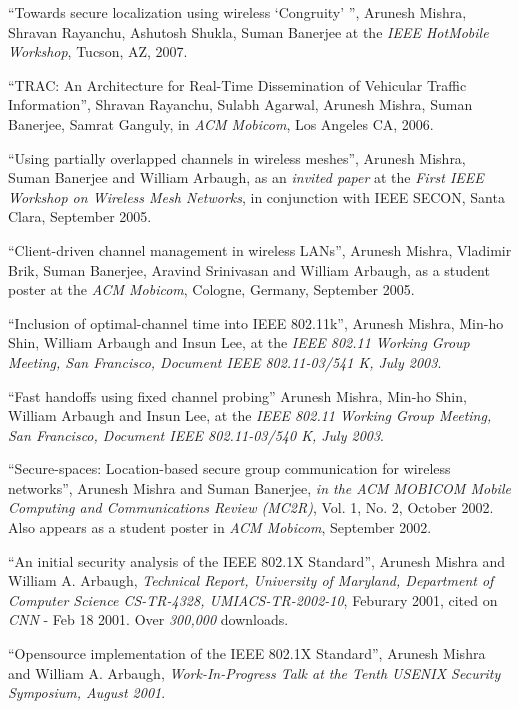 \begin{resume}
\vspace{-0.7cm}

\mybullet ``Towards secure localization using wireless `Congruity' '', Arunesh Mishra, Shravan Rayanchu, Ashutosh Shukla, Suman Banerjee
at the {\it IEEE HotMobile Workshop}, Tucson, AZ, 2007.

\mybullet ``TRAC: An Architecture for Real-Time Dissemination of Vehicular Traffic Information'',
Shravan Rayanchu, Sulabh Agarwal, Arunesh Mishra, Suman Banerjee, Samrat Ganguly,  in {\it ACM Mobicom}, Los Angeles CA, 2006.

\mybullet ``Using partially overlapped channels in wireless meshes'', Arunesh Mishra, Suman Banerjee and William Arbaugh,
as an {\em invited paper} at the {\em First IEEE Workshop on Wireless Mesh Networks}, in conjunction with IEEE SECON,
Santa Clara, September 2005.

\mybullet ``Client-driven channel management in wireless LANs'', Arunesh Mishra, Vladimir Brik, Suman Banerjee, Aravind Srinivasan
and William Arbaugh, as a student poster at  the {\em ACM Mobicom}, Cologne, Germany, September 2005.

\mybullet ``Inclusion of optimal-channel time into IEEE 802.11k'', Arunesh Mishra,  Min-ho Shin, William Arbaugh and Insun Lee,
at the {\em IEEE 802.11 Working Group Meeting, San Francisco, Document IEEE 802.11-03/541 K, July 2003}.

\mybullet ``Fast handoffs using fixed channel probing'' Arunesh Mishra, Min-ho Shin, William Arbaugh and Insun Lee, at the 
{\em IEEE 802.11 Working Group Meeting, San Francisco, Document IEEE 802.11-03/540 K, July 2003}.

\mybullet ``Secure-spaces: Location-based secure group communication for wireless networks'', Arunesh Mishra and 
Suman Banerjee, {\em in the ACM MOBICOM Mobile Computing and Communications Review (MC2R)}, Vol. 1, No. 2, October 2002.
Also appears as a student poster in {\em ACM Mobicom}, September 2002.


\mybullet ``An initial security analysis of the IEEE 802.1X Standard'', Arunesh Mishra and William A. Arbaugh,
{\em Technical Report, University of Maryland, Department of Computer Science CS-TR-4328, 
UMIACS-TR-2002-10}, Feburary 2001, cited on {\em CNN} - Feb 18 2001. Over {\em 300,000} downloads.


\mybullet ``Opensource implementation of the IEEE 802.1X Standard'', Arunesh Mishra and William A. Arbaugh,
{\em Work-In-Progress Talk at the Tenth USENIX Security Symposium, August 2001}.



\end{resume}
